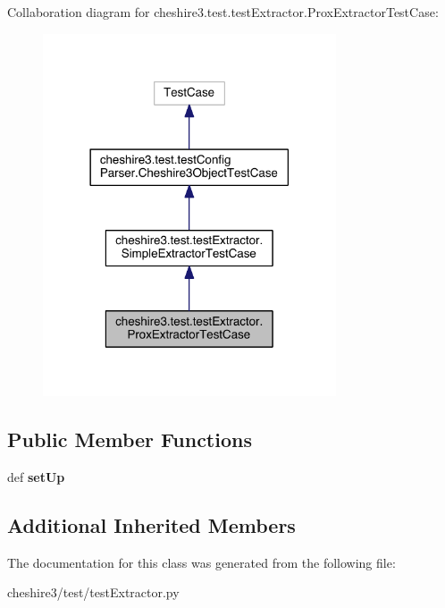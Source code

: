Collaboration diagram for cheshire3.\-test.\-test\-Extractor.\-Prox\-Extractor\-Test\-Case\-:
\nopagebreak
\begin{figure}[H]
\begin{center}
\leavevmode
\includegraphics[width=246pt]{classcheshire3_1_1test_1_1test_extractor_1_1_prox_extractor_test_case__coll__graph}
\end{center}
\end{figure}
\subsection*{Public Member Functions}
\begin{DoxyCompactItemize}
\item 
\hypertarget{classcheshire3_1_1test_1_1test_extractor_1_1_prox_extractor_test_case_a467bfe8c6cad55d5fc9e911961adceee}{def {\bfseries set\-Up}}\label{classcheshire3_1_1test_1_1test_extractor_1_1_prox_extractor_test_case_a467bfe8c6cad55d5fc9e911961adceee}

\end{DoxyCompactItemize}
\subsection*{Additional Inherited Members}


The documentation for this class was generated from the following file\-:\begin{DoxyCompactItemize}
\item 
cheshire3/test/test\-Extractor.\-py\end{DoxyCompactItemize}
